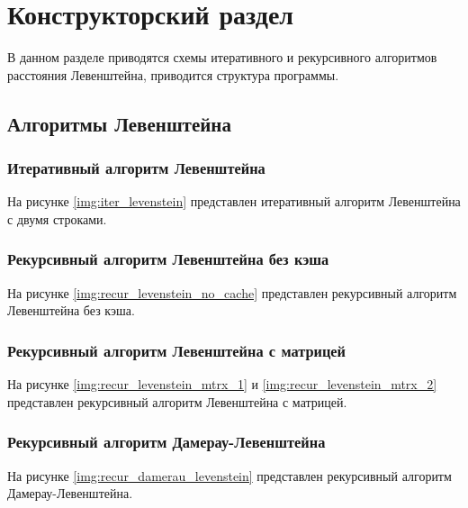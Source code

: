 \chapter{Конструкторский раздел}
В данном разделе приводятся схемы итеративного и рекурсивного алгоритмов расстояния Левенштейна, приводится структура программы.

\section{Алгоритмы Левенштейна}
\subsection{Итеративный алгоритм Левенштейна}
На рисунке \ref{img:iter_levenstein} представлен итеративный алгоритм Левенштейна с двумя строками. 

\subsection{Рекурсивный алгоритм Левенштейна без кэша}
На рисунке \ref{img:recur_levenstein_no_cache} представлен рекурсивный алгоритм Левенштейна без кэша. 

\subsection{Рекурсивный алгоритм Левенштейна с матрицей}
На рисунке \ref{img:recur_levenstein_mtrx_1} и \ref{img:recur_levenstein_mtrx_2} представлен рекурсивный алгоритм Левенштейна с матрицей. 

\subsection{Рекурсивный алгоритм Дамерау-Левенштейна}
На рисунке \ref{img:recur_damerau_levenstein} представлен рекурсивный алгоритм Дамерау-Левенштейна. 

